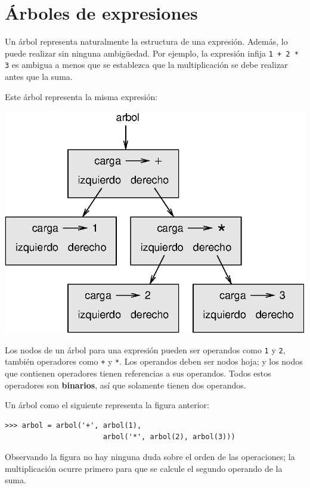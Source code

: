 \section {Árboles de expresiones}

Un árbol representa naturalmente la estructura de una expresión. Además,
lo puede realizar sin ninguna ambigüedad. Por ejemplo, la expresión
infija  \texttt{1 + 2 * 3} es ambigua a menos que se establezca
que la multiplicación se debe realizar antes que la suma.

Este árbol representa la misma expresión:

\beforefig
\centerline{\includegraphics{illustrations/tree2.eps}}
\afterfig

Los nodos de un árbol para una expresión pueden ser operandos como \texttt{1} y
\texttt{2}, también operadores como \texttt{+} y \texttt{*}. Los operandos
deben ser nodos hoja; y los nodos que contienen operadores tienen referencias
a sus operandos. Todos estos operadores son  {\bf binarios}, así que 
solamente tienen dos operandos.

Un árbol como el siguiente representa la figura anterior:

\beforeverb
\begin{verbatim}
>>> arbol = arbol('+', arbol(1), 
                       arbol('*', arbol(2), arbol(3)))
\end{verbatim}
\afterverb
%
Observando la figura no hay ninguna duda sobre el orden de las 
operaciones; la multiplicación ocurre primero para que se calcule
el segundo operando de la suma.

